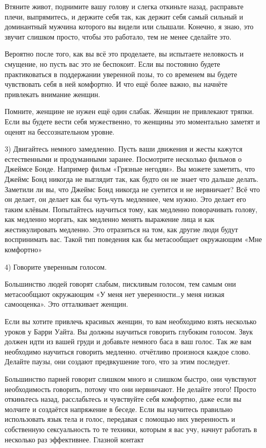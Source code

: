 Втяните живот, поднимите вашу голову и слегка откиньте назад, расправьте плечи, выпрямитесь, и держите себя так, как держит себя самый сильный и доминантный мужчина которого вы видели или слышали. Конечно, я знаю, это звучит слишком просто, чтобы это работало, тем не менее сделайте это.

Вероятно после того, как вы всё это проделаете, вы испытаете неловкость и смущение, но пусть вас это не беспокоит. Если вы постоянно будете практиковаться в поддержании уверенной позы, то со временем вы будете чувствовать себя в ней комфортно. И что ещё более важно, вы начнёте привлекать внимание женщин.

Помните, женщине не нужен ещё один слабак. Женщин не привлекают тряпки. Если вы будете вести себя мужественно, то женщины это моментально заметят и оценят на бессознательном уровне.

3) Двигайтесь немного замедленно. Пусть ваши движения и жесты кажутся естественными и продуманными заранее. Посмотрите несколько фильмов о Джеймсе Бонде. Например фильм «Грязные негодяи». Вы можете заметить, что Джеймс Бонд никогда не выглядит так, как будто он не знает что дальше делать. Заметили ли вы, что Джеймс Бонд никогда не суетится и не нервничает? Всё что он делает, он делает как бы чуть-чуть медленнее, чем нужно. Это делает его таким клёвым. Попытайтесь научиться тому, как медленно поворачивать голову, как медленно моргать, как медленно менять выражение лица и как жестикулировать медленно. Это отразиться на том, как другие люди будут воспринимать вас. Такой тип поведения как бы метасообщает окружающим «Мне комфортно»

4) Говорите уверенным голосом.

Большинство людей говорят слабым, пискливым голосом, тем самым они метасообщают окружающим «У меня нет уверенности\ldots у меня низкая самооценка». Это отталкивает женщин.

Если вы хотите привлечь красивых женщин, то вам необходимо взять несколько уроков у Барри Уайта. Вы должны научиться говорить глубоким голосом. Звук должен идти из вашей груди и добавьте немного баса в ваш голос. Так же вам необходимо научиться говорить медленно. отчётливо произнося каждое слово. Делайте паузы, они создают предвкушение того, что за этим последует.

Большинство парней говорит слишком много и слишком быстро, они чувствуют необходимость говорить, потому что они нервничают. Не делайте этого! Просто откиньтесь назад, расслабьтесь и чувствуйте себя комфортно, даже если вы молчите и создаётся напряжение в беседе. Если вы научитесь правильно использовать язык тела и голос, передавая с помощью них уверенность и собственную сексуальность то те техники, которым я вас учу, начнут работать в несколько раз эффективнее.
Глазной контакт

